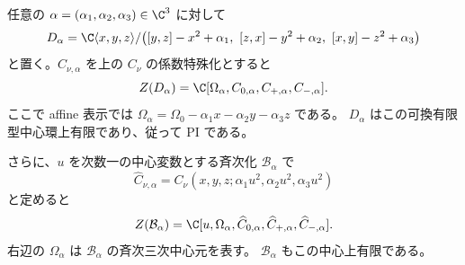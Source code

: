 \begin{theorem}[全定数変形での有限中心性]\label{cmo:thm:finite-center}
任意の $\alpha=(\alpha_1,\alpha_2,\alpha_3)\in\C^3$ に対して
\[
 D_\alpha=\C\langle x,y,z\rangle/
 \bigl([y,z]-x^2+\alpha_1,\ [z,x]-y^2+\alpha_2,
       \ [x,y]-z^2+\alpha_3\bigr)
\]
と置く。$C_{\nu,\alpha}$ を上の $C_\nu$ の係数特殊化とすると
\begin{equation}\label{cmo:eq:affine-center-generators}
 Z(D_\alpha)=\C[\Omega_\alpha,C_{0,\alpha},C_{+,\alpha},C_{-,\alpha}].
\end{equation}
ここで affine 表示では
$\Omega_\alpha=\Omega_0-\alpha_1x-\alpha_2y-\alpha_3z$ である。
$D_\alpha$ はこの可換有限型中心環上有限であり、従って PI である。

さらに、$u$ を次数一の中心変数とする斉次化 $\mathcal B_\alpha$ で
\[
 \widehat C_{\nu,\alpha}
     =C_\nu(x,y,z;\alpha_1u^2,\alpha_2u^2,\alpha_3u^2)
\]
と定めると
\begin{equation}\label{cmo:eq:homogeneous-center-generators}
 Z(\mathcal B_\alpha)=\C[u,\Omega_\alpha,
             \widehat C_{0,\alpha},\widehat C_{+,\alpha},\widehat C_{-,\alpha}].
\end{equation}
右辺の $\Omega_\alpha$ は $\mathcal B_\alpha$ の斉次三次中心元を表す。
$\mathcal B_\alpha$ もこの中心上有限である。
\end{theorem}


